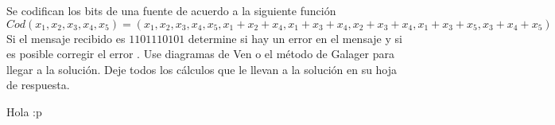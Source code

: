 
Se codifican los bits de una fuente de acuerdo a la siguiente función 
$$Cod (x_1, x_2, x_3, x_4, x_5) = (x_1, x_2, x_3, x_4, x_5, x_1 + x_2 + x_4, x_1 + x_3 + x_4, x_2 + x_3 + x_4, x_1 + x_3 + x_5, x_3 + x_4 + x_5)$$
Si el mensaje recibido es $1101110101$ determine si hay un error en el mensaje
y si es posible corregir el error . Use diagramas de Ven o el método de Galager
para llegar a la solución. Deje todos los cálculos que le llevan a la solución en su hoja de respuesta.
\begin{sol}
    Hola :p
\end{sol}